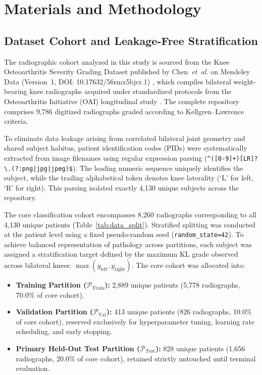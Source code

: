 \documentclass[10pt,journal]{IEEEtran}
\begin{document}
\section{Materials and Methodology}
\label{sec:methodology}

\subsection{Dataset Cohort and Leakage-Free Stratification}
\label{subsec:dataset}

The radiographic cohort analyzed in this study is sourced from the Knee Osteoarthritis Severity Grading Dataset published by Chen~\textit{et~al.} on Mendeley Data (Version~1, DOI: 10.17632/56rmx5bjcr.1) \cite{chen2018dataset}, which compiles bilateral weight-bearing knee radiographs acquired under standardized protocols from the Osteoarthritis Initiative (OAI) longitudinal study \cite{nevitt2006oai}. The complete repository comprises 9,786 digitized radiographs graded according to Kellgren--Lawrence criteria.

To eliminate data leakage arising from correlated bilateral joint geometry and shared subject habitus, patient identification codes (PIDs) were systematically extracted from image filenames using regular expression parsing (\texttt{\textasciicircum([0-9]+)[LR]?\textbackslash.(?:png|jpg|jpeg)\$}). The leading numeric sequence uniquely identifies the subject, while the trailing alphabetical token denotes knee laterality (`L' for left, `R' for right). This parsing isolated exactly 4,130 unique subjects across the repository.

The core classification cohort encompasses 8,260 radiographs corresponding to all 4,130 unique patients (Table~\ref{tab:data_split}). Stratified splitting was conducted at the patient level using a fixed pseudo-random seed (\texttt{random\_state=42}). To achieve balanced representation of pathology across partitions, each subject was assigned a stratification target defined by the maximum KL grade observed across bilateral knees: $\max(y_{\text{left}}, y_{\text{right}})$. The core cohort was allocated into:
\begin{itemize}[leftmargin=*]
\item \textbf{Training Partition ($\mathcal{P}_{\text{Train}}$):} 2,889 unique patients (5,778 radiographs, 70.0\% of core cohort).
\item \textbf{Validation Partition ($\mathcal{P}_{\text{Val}}$):} 413 unique patients (826 radiographs, 10.0\% of core cohort), reserved exclusively for hyperparameter tuning, learning rate scheduling, and early stopping.
\item \textbf{Primary Held-Out Test Partition ($\mathcal{P}_{\text{Test}}$):} 828 unique patients (1,656 radiographs, 20.0\% of core cohort), retained strictly untouched until terminal evaluation.
\end{itemize}
\end{document}
